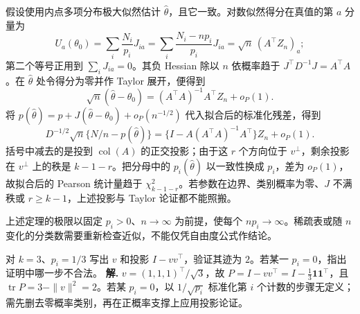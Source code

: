 假设使用内点多项分布极大似然估计 \(\widehat\theta\)，且它一致。对数似然得分在真值的第 \(a\) 分量为
\[
U_a(\theta_0)
=\sum_i\frac{N_i}{p_i}J_{ia}
=\sum_i\frac{N_i-np_i}{p_i}J_{ia}
=\sqrt n\,(A^\top Z_n)_a;
\]
第二个等号正用到 \(\sum_iJ_{ia}=0\)。其负 Hessian 除以 \(n\) 依概率趋于
\(J^\top D^{-1}J=A^\top A\)。在 \(\widehat\theta\) 处令得分为零并作 Taylor 展开，便得到
\[
\sqrt n(\widehat\theta-\theta_0)
=(A^\top A)^{-1}A^\top Z_n+o_P(1).
\]
将 \(p(\widehat\theta)=p+J(\widehat\theta-\theta_0)+o_P(n^{-1/2})\)
代入拟合后的标准化残差，得到
\[
D^{-1/2}\sqrt n\{N/n-p(\widehat\theta)\}
=\{I-A(A^\top A)^{-1}A^\top\}Z_n+o_P(1).
\]
括号中减去的是投到 \(\operatorname{col}(A)\) 的正交投影；由于这 \(r\) 个方向位于 \(v^\perp\)，剩余投影在 \(v^\perp\) 上的秩是 \(k-1-r\)。把分母中的 \(p_i(\widehat\theta)\) 以一致性换成 \(p_i\)，差为 \(o_P(1)\)，故拟合后的 Pearson 统计量趋于
\(\chi^2_{k-1-r}\)。若参数在边界、类别概率为零、\(J\) 不满秩或 \(r\ge k-1\)，上述投影与 Taylor 论证都不能照搬。

上述定理的极限以固定 \(p_i>0\)、\(n\to\infty\) 为前提，使每个 \(np_i\to\infty\)。稀疏表或随 \(n\) 变化的分类数需要重新检查近似，不能仅凭自由度公式作结论。



\par
\begin{workedexample}
对 \(k=3\)、\(p_i=1/3\) 写出 \(v\) 和投影 \(I-vv^\top\)，验证其迹为 \(2\)。若某一 \(p_i=0\)，指出证明中哪一步不合法。
\textbf{解.} \(v=(1,1,1)^\top/\sqrt3\)，故 \(P=I-vv^\top=I-\frac13\mathbf1\mathbf1^\top\)，且 \(\operatorname{tr}P=3-\|v\|^2=2\)。若某 \(p_i=0\)，以 \(1/\sqrt{p_i}\) 标准化第 \(i\) 个计数的步骤无定义；需先删去零概率类别，再在正概率支撑上应用投影论证。
\end{workedexample}
\par
